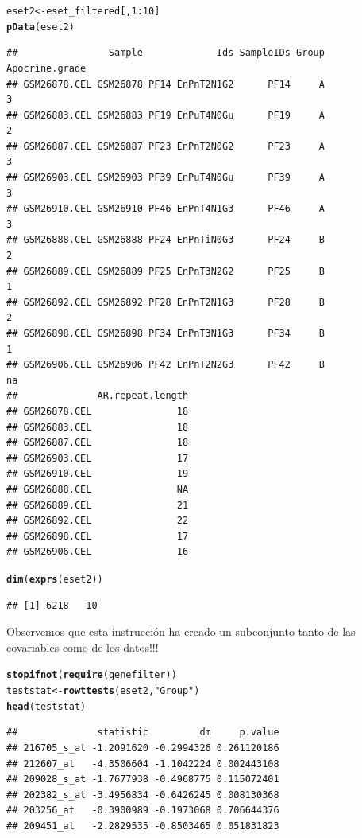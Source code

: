 \documentclass[a4paper]{article}\usepackage[]{graphicx}\usepackage[]{color}
\makeatletter
\newcommand{\hlnum}[1]{\textcolor[rgb]{0.686,0.059,0.569}{#1}}%
\newcommand{\hlstr}[1]{\textcolor[rgb]{0.192,0.494,0.8}{#1}}%
\newcommand{\hlopt}[1]{\textcolor[rgb]{0,0,0}{#1}}%
\newcommand{\hlstd}[1]{\textcolor[rgb]{0.345,0.345,0.345}{#1}}%
\newcommand{\hlkwb}[1]{\textcolor[rgb]{0.69,0.353,0.396}{#1}}%
\newcommand{\hlkwd}[1]{\textcolor[rgb]{0.737,0.353,0.396}{\textbf{#1}}}%
\newenvironment{kframe}{%
 \def\at@end@of@kframe{}%
 \ifinner\ifhmode%
  \def\at@end@of@kframe{\end{minipage}}%
  \begin{minipage}{\columnwidth}%
 \fi\fi%
 \def\FrameCommand##1{\hskip\@totalleftmargin \hskip-\fboxsep
 \colorbox{shadecolor}{##1}\hskip-\fboxsep
     \hskip-\linewidth \hskip-\@totalleftmargin \hskip\columnwidth}%
 \MakeFramed {\advance\hsize-\width
   \@totalleftmargin\z@ \linewidth\hsize
   \@setminipage}}%
 {\par\unskip\endMakeFramed%
 \at@end@of@kframe}
\newenvironment{knitrout}{}{} %
\makeatother
\begin{document}
\begin{knitrout}
\color{fgcolor}\begin{kframe}
\begin{alltt}
\hlstd{eset2} \hlkwb{<-} \hlstd{eset_filtered[,}\hlnum{1}\hlopt{:}\hlnum{10}\hlstd{]}
\hlkwd{pData}\hlstd{(eset2)}
\end{alltt}
\begin{verbatim}
##                Sample             Ids SampleIDs Group Apocrine.grade
## GSM26878.CEL GSM26878 PF14 EnPnT2N1G2      PF14     A              3
## GSM26883.CEL GSM26883 PF19 EnPuT4N0Gu      PF19     A              2
## GSM26887.CEL GSM26887 PF23 EnPnT2N0G2      PF23     A              3
## GSM26903.CEL GSM26903 PF39 EnPuT4N0Gu      PF39     A              3
## GSM26910.CEL GSM26910 PF46 EnPnT4N1G3      PF46     A              3
## GSM26888.CEL GSM26888 PF24 EnPnTiN0G3      PF24     B              2
## GSM26889.CEL GSM26889 PF25 EnPnT3N2G2      PF25     B              1
## GSM26892.CEL GSM26892 PF28 EnPnT2N1G3      PF28     B              2
## GSM26898.CEL GSM26898 PF34 EnPnT3N1G3      PF34     B              1
## GSM26906.CEL GSM26906 PF42 EnPnT2N2G3      PF42     B             na
##              AR.repeat.length
## GSM26878.CEL               18
## GSM26883.CEL               18
## GSM26887.CEL               18
## GSM26903.CEL               17
## GSM26910.CEL               19
## GSM26888.CEL               NA
## GSM26889.CEL               21
## GSM26892.CEL               22
## GSM26898.CEL               17
## GSM26906.CEL               16
\end{verbatim}
\begin{alltt}
\hlkwd{dim}\hlstd{(}\hlkwd{exprs}\hlstd{(eset2))}
\end{alltt}
\begin{verbatim}
## [1] 6218   10
\end{verbatim}
\end{kframe}
\end{knitrout}

Observemos que esta instrucción ha creado un subconjunto tanto de las covariables como de los datos!!!

\begin{knitrout}
\color{fgcolor}\begin{kframe}
\begin{alltt}
\hlkwd{stopifnot}\hlstd{(}\hlkwd{require}\hlstd{(genefilter))}
\hlstd{teststat} \hlkwb{<-}\hlkwd{rowttests}\hlstd{(eset2,} \hlstr{"Group"}\hlstd{)}
\hlkwd{head}\hlstd{(teststat)}
\end{alltt}
\begin{verbatim}
##              statistic         dm     p.value
## 216705_s_at -1.2091620 -0.2994326 0.261120186
## 212607_at   -4.3506604 -1.1042224 0.002443108
## 209028_s_at -1.7677938 -0.4968775 0.115072401
## 202382_s_at -3.4956834 -0.6426245 0.008130368
## 203256_at   -0.3900989 -0.1973068 0.706644376
## 209451_at   -2.2829535 -0.8503465 0.051831823
\end{verbatim}
\end{kframe}
\end{knitrout}
\end{document}
